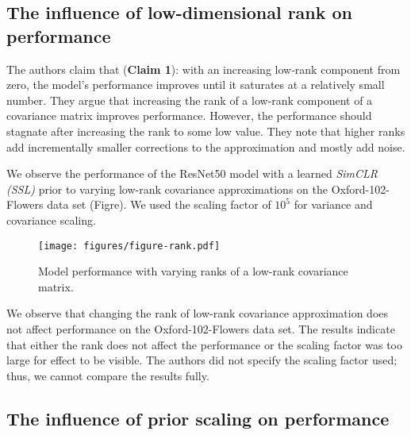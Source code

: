 

\subsection{The influence of low-dimensional rank on performance}

The authors claim that (\textbf{Claim 1}): with an increasing low‐rank component from zero, the model's performance improves until it saturates at a relatively small number.
They argue that increasing the rank of a low-rank component of a covariance matrix improves performance.
However, the performance should stagnate after increasing the rank to some low value. They note that higher ranks add incrementally smaller corrections to the approximation and mostly add noise.

We observe the performance of the ResNet50 model with a learned \textit{SimCLR (SSL)} prior to varying low-rank covariance approximations on the Oxford-102-Flowers data set (Figre). We used the scaling factor of $10^5$ for variance and covariance scaling.

\begin{figure}[ht]
    \centering
    \texttt{[image: figures/figure-rank.pdf]}
    \caption{Model performance with varying ranks of a low-rank covariance matrix.}
    \label{fig:ranks}
\end{figure}

We observe that changing the rank of low-rank covariance approximation does not affect performance on the Oxford-102-Flowers data set.
The results indicate that either the rank does not affect the performance or the scaling factor was too large for effect to be visible.
The authors did not specify the scaling factor used; thus, we cannot compare the results fully.

\subsection{The influence of prior scaling on performance}

